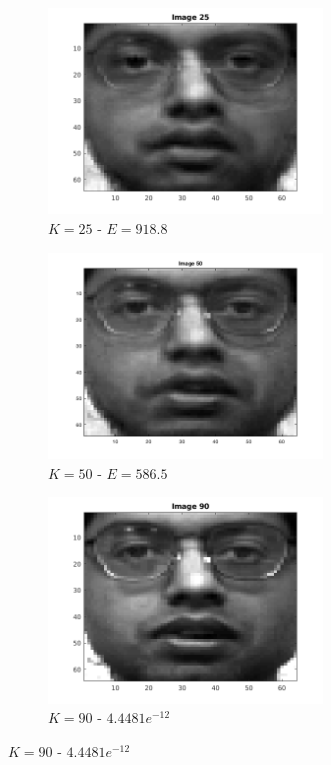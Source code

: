 \documentclass[a4paper]{article}
\begin{document}
\begin{figure}[H]
    \begin{subfigure}[c]{0.3\textwidth}
        \centering
        \includegraphics[width=0.8\textwidth]{images/ex3_55_25.png}
        \caption{$K=25$ - $E = 918.8$}
        \label{subfig:ex3_55_25}
    \end{subfigure}
    \begin{subfigure}[c]{0.3\textwidth}
        \centering
        \includegraphics[width=0.8\textwidth]{images/ex3_55_50.png}
        \caption{$K=50$ - $E = 586.5$}
        \label{subfig:ex3_55_50}
    \end{subfigure}
    \begin{subfigure}[c]{0.3\textwidth}
        \centering
        \includegraphics[width=0.8\textwidth]{images/ex3_55_90.png}
        \caption{$K=90$ - $4.4481e^{-12}$}
        \label{subfig:ex3_55_90}
    \end{subfigure}


\end{figure}
\end{document}
